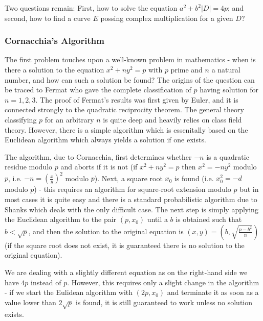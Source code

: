 \documentclass[11pt,english]{article}
\begin{document}
Two questions remain: First, how to solve the equation $a^2+b^2|D|=4p$; and second, how to find a curve $E$ possing complex multiplication for
a given $D$?

\subsubsection{Cornacchia's Algorithm}
The first problem touches upon a well-known problem in mathematics - when is there a solution to the equation $x^2+ny^2=p$ with $p$ prime and
$n$ a natural number, and how can such a solution be found? The origins of the question can be traced to Fermat who gave the complete classification of
$p$ having solution for $n=1,2,3$. The proof of Fermat's results was first given by Euler, and it is connected strongly to the quadratic reciprocity theorem.
The general theory classifying $p$ for an arbitrary $n$ is quite deep and heavily relies on class field theory. However, there is a simple algorithm which
is essenitally based on the Euclidean algorithm which always yields a solution if one exists.

The algorithm, due to Cornacchia, first determines whether $-n$ is a quadratic residue modulo $p$ and aborts if it is not (if $x^2+ny^2=p$ then $x^2=-ny^2$ modulo $p$,
i.e. $-n=\left(\frac{x}{y}\right)^2$ modulo $p$). Next, a square root $x_0$ is found (i.e. $x_0^2=-d$ modulo $p$) - this requires an algorithm for square-root
extension modulo $p$ but in most cases it is quite easy and there is a standard probabilistic algorithm due to Shanks which deals with the only difficult case.
The next step is simply applying the Euclidean algorithm to the pair $(p,x_0)$ until a $b$ is obtained such that $b<\sqrt{p}$, and then the solution to the original equation
is $(x,y)=\left(b,\sqrt{\frac{p-b^2}{n}}\right)$ (if the square root does not exist, it is guaranteed there is no solution to the original equation).

We are dealing with a slightly different equation as on the right-hand side we have $4p$ instead of $p$. However, this requires only a slight change in
the algorithm - if we start the Eulidean algorithm with $(2p,x_0)$ and terminate it as soon as a value lower than $2\sqrt{p}$ is found, it is still guaranteed
to work unless no solution exists.
\end{document}
